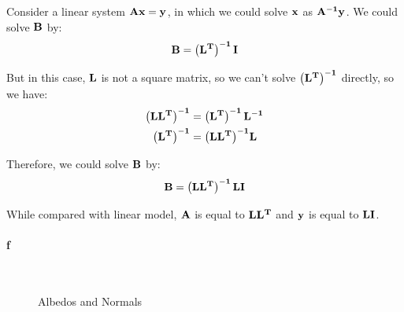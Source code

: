 \documentclass[11pt]{article} \usepackage{fullpage} \usepackage{graphicx} \usepackage{epstopdf} \usepackage{color} \usepackage{psfrag} \usepackage{pdfsync}\usepackage{indentfirst}\usepackage{subfigure}\usepackage{float}\usepackage[section]{placeins}
\begin{document}
Consider a linear system $\bold{Ax} = \bold{y}$, in which we could solve $\bold{x}$ as $\bold{A^{-1}y}$. We could solve $\bold{B}$ by:
\begin{equation}
	\bold{B} = \bold{\left(L^{\mathbf{T}}\right)^{-1}I}
\end{equation}

But in this case, $\bold{L}$ is not a square matrix, so we can't solve $\bold{\left(L^{\mathbf{T}}\right)^{-1}}$ directly, so we have:
\begin{align}
	\bold{\left(LL^{\mathbf{T}}\right)^{-1}} & = \bold{\left(L^{\mathbf{T}}\right)^{-1}L^{-1}} \\
	\bold{\left(L^{\mathbf{T}}\right)^{-1}} & = \bold{\left(LL^{\mathbf{T}}\right)^{-1}}\bold{L}
\end{align}

Therefore, we could solve $\bold{B}$ by:
\begin{equation}
	\bold{B} = \bold{\left(LL^{\mathbf{T}}\right)^{-1}\bold{L}I}
\end{equation}

While compared with linear model, $\bold{A}$ is equal to $\bold{LL^{\mathbf{T}}}$ and $\bold{y}$ is equal to $\bold{LI}$.

\paragraph{f}~{}

\begin{figure}[H]
\centering
{}
\caption{Albedos and Normals}
\end{figure}
\end{document}
